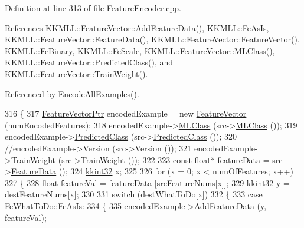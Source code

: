 Definition at line 313 of file Feature\+Encoder.\+cpp.



References K\+K\+M\+L\+L\+::\+Feature\+Vector\+::\+Add\+Feature\+Data(), K\+K\+M\+L\+L\+::\+Fe\+As\+Is, K\+K\+M\+L\+L\+::\+Feature\+Vector\+::\+Feature\+Data(), K\+K\+M\+L\+L\+::\+Feature\+Vector\+::\+Feature\+Vector(), K\+K\+M\+L\+L\+::\+Fe\+Binary, K\+K\+M\+L\+L\+::\+Fe\+Scale, K\+K\+M\+L\+L\+::\+Feature\+Vector\+::\+M\+L\+Class(), K\+K\+M\+L\+L\+::\+Feature\+Vector\+::\+Predicted\+Class(), and K\+K\+M\+L\+L\+::\+Feature\+Vector\+::\+Train\+Weight().



Referenced by Encode\+All\+Examples().


\begin{DoxyCode}
316 \{
317   \hyperlink{class_k_k_m_l_l_1_1_feature_vector}{FeatureVectorPtr}  encodedExample = \textcolor{keyword}{new} \hyperlink{class_k_k_m_l_l_1_1_feature_vector}{FeatureVector} (numEncodedFeatures);
318   encodedExample->\hyperlink{class_k_k_m_l_l_1_1_feature_vector_a3c8fe002c6e868f8c00059c004fb32fd}{MLClass}     (src->\hyperlink{class_k_k_m_l_l_1_1_feature_vector_a3c8fe002c6e868f8c00059c004fb32fd}{MLClass}     ());
319   encodedExample->\hyperlink{class_k_k_m_l_l_1_1_feature_vector_a3ec4b39405a2904c966a505c391cff33}{PredictedClass} (src->\hyperlink{class_k_k_m_l_l_1_1_feature_vector_a3ec4b39405a2904c966a505c391cff33}{PredictedClass} ());
320   \textcolor{comment}{//encodedExample->Version        (src->Version        ());}
321   encodedExample->\hyperlink{class_k_k_m_l_l_1_1_feature_vector_a41a0c12e722a21446dd34f95b49dd82e}{TrainWeight}    (src->\hyperlink{class_k_k_m_l_l_1_1_feature_vector_a41a0c12e722a21446dd34f95b49dd82e}{TrainWeight}    ());
322 
323   \textcolor{keyword}{const} \textcolor{keywordtype}{float}*  featureData = src->\hyperlink{class_k_k_m_l_l_1_1_feature_vector_af055b7c725a4d80a31cd2f6606cc37b6}{FeatureData} ();
324   \hyperlink{namespace_k_k_b_a8fa4952cc84fda1de4bec1fbdd8d5b1b}{kkint32}  x;
325 
326   \textcolor{keywordflow}{for}  (x = 0;  x < numOfFeatures; x++)
327   \{
328     \textcolor{keywordtype}{float}  featureVal = featureData [srcFeatureNums[x]];
329     \hyperlink{namespace_k_k_b_a8fa4952cc84fda1de4bec1fbdd8d5b1b}{kkint32}  y = destFeatureNums[x];
330 
331     \textcolor{keywordflow}{switch} (destWhatToDo[x])
332     \{
333     \textcolor{keywordflow}{case}  \hyperlink{namespace_k_k_m_l_l_aa7a52865d78241e93b30731e46f99b43a8fdde05abb9506fd4caa93ddc4490a13}{FeWhatToDo::FeAsIs}:
334       \{
335         encodedExample->\hyperlink{class_k_k_m_l_l_1_1_feature_vector_abf364e3348c041cd7be6f14d6c4567cf}{AddFeatureData} (y, featureVal);

\end{DoxyCode}
